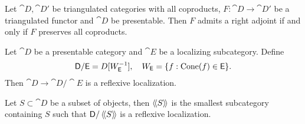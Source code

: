 \begin{theorem}
Let $\cat{D},\cat{D}'$ be triangulated categories with all coproducts, $F:\cat{D}\to
\cat{D}'$ be a triangulated functor and $\cat{D}$ be presentable. Then $F$ admits a right
adjoint if and only if $F$ preserves all coproducts.
\end{theorem}
\begin{corollary}
Let $\cat{D}$ be a presentable category and $\cat{E}$ be a localizing subcategory. Define
\[
\mathsf{D} / \mathsf{E} = D[W_{\mathsf{E}}^{-1}],\quad W_{\mathsf{E}} = \{f:\operatorname{Cone}(f)\in \mathsf{E}\}
.\]
Then $\cat{D} \to \cat{D} /\cat{E}$ is a reflexive localization.
\end{corollary}
Let $S\subset \cat{D}$ be a subset of objects, then $\left\langle\!\left\langle S \right\rangle\!\right\rangle$ is the smallest subcategory
containing $S$ such that $\mathsf{D} /\left\langle\!\left\langle S \right\rangle\!\right\rangle$ is a reflexive localization.


